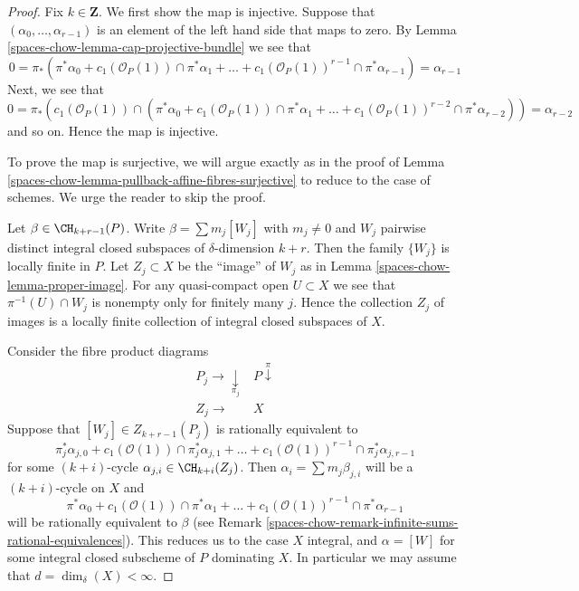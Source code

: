 \begin{proof}
Fix $k \in \mathbf{Z}$. We first show the map is injective.
Suppose that $(\alpha_0, \ldots, \alpha_{r - 1})$ is an element
of the left hand side that maps to zero.
By Lemma \ref{spaces-chow-lemma-cap-projective-bundle} we see that
$$
0 = \pi_*(\pi^*\alpha_0 +
c_1(\mathcal{O}_P(1)) \cap \pi^*\alpha_1
+ \ldots +
c_1(\mathcal{O}_P(1))^{r - 1} \cap \pi^*\alpha_{r-1})
= \alpha_{r - 1}
$$
Next, we see that
$$
0 = \pi_*(c_1(\mathcal{O}_P(1)) \cap (\pi^*\alpha_0 +
c_1(\mathcal{O}_P(1)) \cap \pi^*\alpha_1
+ \ldots +
c_1(\mathcal{O}_P(1))^{r - 2} \cap \pi^*\alpha_{r - 2}))
= \alpha_{r - 2}
$$
and so on. Hence the map is injective.

\medskip\noindent
To prove the map is surjective, we will argue exactly
as in the proof of Lemma \ref{spaces-chow-lemma-pullback-affine-fibres-surjective}
to reduce to the case of schemes.
We urge the reader to skip the proof.

\medskip\noindent
Let $\beta \in \CH_{k + r - 1}(P)$. Write $\beta = \sum m_j[W_j]$ with
$m_j \not = 0$ and $W_j$ pairwise distinct integral closed subspaces of
$\delta$-dimension $k + r$. Then the family $\{W_j\}$
is locally finite in $P$. Let $Z_j \subset X$ be the ``image''
of $W_j$ as in Lemma \ref{spaces-chow-lemma-proper-image}. For any quasi-compact open
$U \subset X$ we see that $\pi^{-1}(U) \cap W_j$
is nonempty only for finitely many $j$. Hence the
collection $Z_j$ of images is a locally finite collection
of integral closed subspaces of $X$.

\medskip\noindent
Consider the fibre product diagrams
$$
\begin{array}{cc}P_j \longrightarrow\underset{\pi_j}{\downarrow} & P \overset{\pi}{\downarrow} \\ Z_j \longrightarrow & X\end{array}
$$
Suppose that $[W_j] \in Z_{k + r - 1}(P_j)$
is rationally equivalent to
$$
\pi_j^*\alpha_{j, 0} +
c_1(\mathcal{O}(1)) \cap \pi_j^*\alpha_{j, 1} +
\ldots +
c_1(\mathcal{O}(1))^{r - 1} \cap \pi_j^*\alpha_{j, r - 1}
$$
for some $(k + i)$-cycle $\alpha_{j, i} \in \CH_{k + i}(Z_j)$. Then
$\alpha_i = \sum m_j \beta_{j, i}$ will be a $(k + i)$-cycle on $X$
and
$$
\pi^*\alpha_0 +
c_1(\mathcal{O}(1)) \cap \pi^*\alpha_1 +
\ldots +
c_1(\mathcal{O}(1))^{r - 1} \cap \pi^*\alpha_{r - 1}
$$
will be rationally equivalent to $\beta$ (see
Remark \ref{spaces-chow-remark-infinite-sums-rational-equivalences}).
This reduces us to the case $X$ integral, and
$\alpha = [W]$ for some integral closed subscheme
of $P$ dominating $X$. In particular we may
assume that $d = \dim_\delta(X) < \infty$.


\end{proof}
